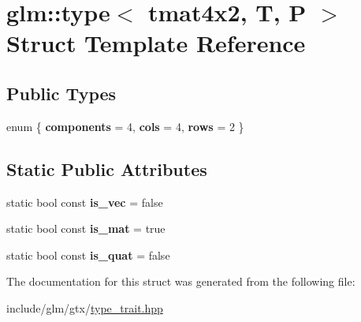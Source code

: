 \hypertarget{structglm_1_1type_3_01tmat4x2_00_01T_00_01P_01_4}{}\section{glm\+:\+:type$<$ tmat4x2, T, P $>$ Struct Template Reference}
\label{structglm_1_1type_3_01tmat4x2_00_01T_00_01P_01_4}
\subsection*{Public Types}
\begin{DoxyCompactItemize}
\item 
\mbox{\label{structglm_1_1type_3_01tmat4x2_00_01T_00_01P_01_4_a6251983a7e0e6eb97e8e17fdc3add04c}} 
enum \{ {\bfseries components} = 4, 
{\bfseries cols} = 4, 
{\bfseries rows} = 2
 \}
\end{DoxyCompactItemize}
\subsection*{Static Public Attributes}
\begin{DoxyCompactItemize}
\item 
\mbox{\label{structglm_1_1type_3_01tmat4x2_00_01T_00_01P_01_4_a501af9781d0bcd0426334f04c96cd5d8}} 
static bool const {\bfseries is\+\_\+vec} = false
\item 
\mbox{\label{structglm_1_1type_3_01tmat4x2_00_01T_00_01P_01_4_aa7e073a165d8540230bcd8bf27514179}} 
static bool const {\bfseries is\+\_\+mat} = true
\item 
\mbox{\label{structglm_1_1type_3_01tmat4x2_00_01T_00_01P_01_4_aa84a332b30401e37a096b469f44dce09}} 
static bool const {\bfseries is\+\_\+quat} = false
\end{DoxyCompactItemize}


The documentation for this struct was generated from the following file\+:\begin{DoxyCompactItemize}
\item 
include/glm/gtx/\hyperlink{type__trait_8hpp}{type\+\_\+trait.\+hpp}\end{DoxyCompactItemize}
